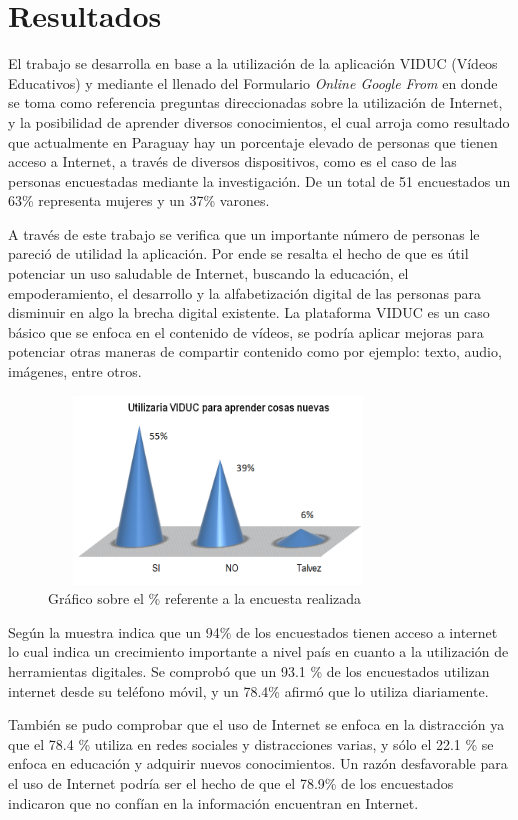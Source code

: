 \documentclass[runningheads]{llncs}
\begin{document}
\section{Resultados}
El trabajo se desarrolla en base a la utilización de la aplicación VIDUC (Vídeos Educativos) y mediante el llenado del Formulario \textit{Online Google From} en donde se toma como referencia preguntas direccionadas sobre la utilización de Internet, y la posibilidad de aprender diversos conocimientos, el cual arroja como resultado que actualmente en Paraguay hay un porcentaje elevado de personas que tienen acceso a Internet, a través de diversos dispositivos, como es el caso de las personas encuestadas mediante la investigación. De un total de 51 encuestados un 63\% representa mujeres y un 37\% varones.

A través de este trabajo se verifica que un importante número de personas le pareció de utilidad la aplicación. Por ende se resalta el hecho de que es útil potenciar un uso saludable de Internet, buscando la educación, el empoderamiento, el desarrollo y la alfabetización digital de las personas para disminuir en algo la brecha digital existente. La plataforma VIDUC es un caso básico que se enfoca en el contenido de vídeos, se podría aplicar mejoras para potenciar otras maneras de compartir contenido como por ejemplo: texto, audio, imágenes, entre otros.
\begin{figure}[h]
\caption{Gráfico sobre el \% referente a la encuesta realizada}
\centering
\includegraphics[width=9cm, height=5cm]{viduc.PNG}
\end{figure}

Según la muestra indica que un 94\% de los encuestados tienen acceso a internet lo cual indica un crecimiento importante a nivel país en cuanto a la utilización de herramientas digitales. Se comprobó que un 93.1 \% de los encuestados utilizan internet desde su teléfono móvil, y un 78.4\% afirmó  que lo utiliza diariamente.

También se pudo comprobar que el uso de Internet se enfoca en la distracción ya que el 78.4 \% utiliza en redes sociales y  distracciones varias, y sólo el 22.1 \% se enfoca en educación y adquirir nuevos conocimientos. Un razón desfavorable para el uso de Internet podría ser el hecho de que el 78.9\% de los encuestados indicaron que no confían en la información encuentran en Internet.
\end{document}
